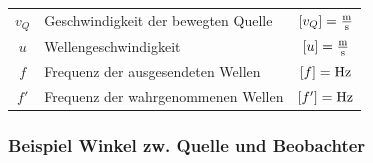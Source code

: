 \begin{tabular}{clc}
$v_Q$ & Geschwindigkeit der bewegten Quelle & $[v_Q] = \frac{\mathrm{m}}{\mathrm{s}}$ \\
$u$ & Wellengeschwindigkeit & $[u] = \frac{\mathrm{m}}{\mathrm{s}}$ \\
$f$ & Frequenz der ausgesendeten Wellen & $[f] = \mathrm{Hz}$ \\
$f'$ & Frequenz der wahrgenommenen Wellen & $[f'] = \mathrm{Hz}$ \\
\end{tabular}



\subsubsection{Beispiel Winkel zw. Quelle und Beobachter}

